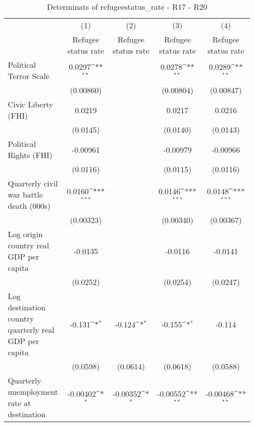 \begin{table}[htbp]\centering
\def\sym#1{\ifmmode^{#1}\else\(^{#1}\)\fi}
\caption{Determinats of refugeestatus\_rate - R17 - R20}
\begin{tabular}{l*{4}{c}}
\hline\hline
                    &\multicolumn{1}{c}{(1)}&\multicolumn{1}{c}{(2)}&\multicolumn{1}{c}{(3)}&\multicolumn{1}{c}{(4)}\\
                    &\multicolumn{1}{c}{Refugee status rate}&\multicolumn{1}{c}{Refugee status rate}&\multicolumn{1}{c}{Refugee status rate}&\multicolumn{1}{c}{Refugee status rate}\\
\hline
Political Terror Scale&      0.0297\sym{**} &                     &      0.0278\sym{**} &      0.0289\sym{**} \\
                    &   (0.00860)         &                     &   (0.00804)         &   (0.00847)         \\
[1em]
Civic Liberty (FHI) &      0.0219         &                     &      0.0217         &      0.0216         \\
                    &    (0.0145)         &                     &    (0.0140)         &    (0.0143)         \\
[1em]
Political Rights (FHI)&    -0.00961         &                     &    -0.00979         &    -0.00966         \\
                    &    (0.0116)         &                     &    (0.0115)         &    (0.0116)         \\
[1em]
Quarterly civil war battle death (000s)&      0.0160\sym{***}&                     &      0.0146\sym{***}&      0.0148\sym{***}\\
                    &   (0.00323)         &                     &   (0.00340)         &   (0.00367)         \\
[1em]
Log origin country real GDP per capita&     -0.0135         &                     &     -0.0116         &     -0.0141         \\
                    &    (0.0252)         &                     &    (0.0254)         &    (0.0247)         \\
[1em]
Log destination country quarterly real GDP per capita&      -0.131\sym{*}  &      -0.124\sym{*}  &      -0.155\sym{*}  &      -0.114         \\
                    &    (0.0598)         &    (0.0614)         &    (0.0618)         &    (0.0588)         \\
[1em]
Quarterly unemployment rate at destination&    -0.00402\sym{*}  &    -0.00352\sym{*}  &    -0.00552\sym{**} &    -0.00468\sym{**} \\

\end{tabular}
\end{table}
